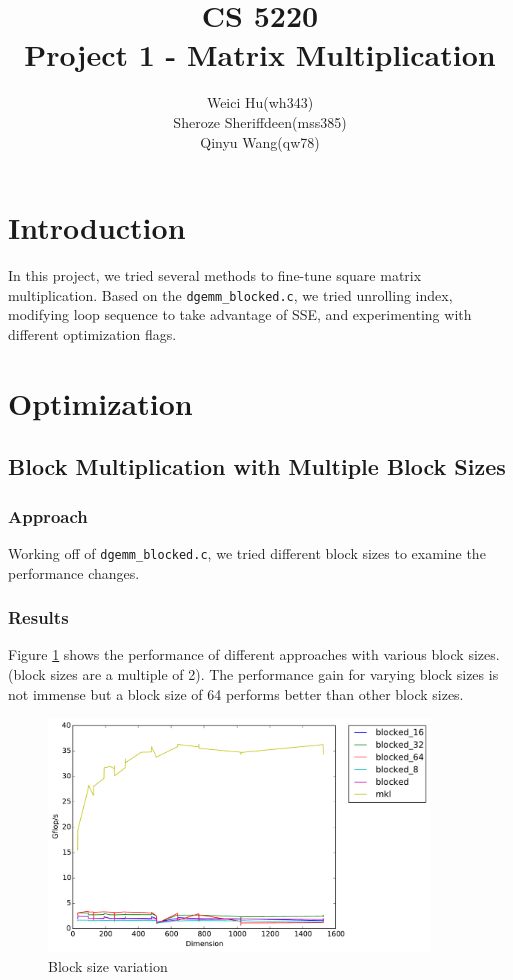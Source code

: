 \documentclass[11pt]{article}
\theoremstyle{plain}
\theoremstyle{definition}
\begin{document}
\title{CS 5220\\ Project 1 - Matrix Multiplication}
\author{Weici Hu(wh343)\\ Sheroze Sheriffdeen(mss385)\\ Qinyu Wang(qw78)}
\maketitle

\section{Introduction}
In this project, we tried several methods to fine-tune square matrix multiplication.
Based on the \texttt{dgemm\_blocked.c}, we tried unrolling index, modifying loop sequence to take advantage of SSE, and experimenting with different optimization flags.

\section{Optimization}
\subsection{Block Multiplication with Multiple Block Sizes}
\subsubsection{Approach}
Working off of \texttt{dgemm\_blocked.c}, we tried different block sizes to examine the performance changes. 
\subsubsection{Results}
Figure \ref{1} shows the performance of different approaches with various block sizes. (block sizes are a multiple of 2). The performance gain for varying block sizes is not immense but a block size of 64 performs better than other block sizes. \\

\begin{figure}[H]
    \includegraphics[width=0.9\textwidth]{timing_block_size_changes.pdf}
    \caption{Block size variation}
    \label{1}
\end{figure} 
\end{document}
